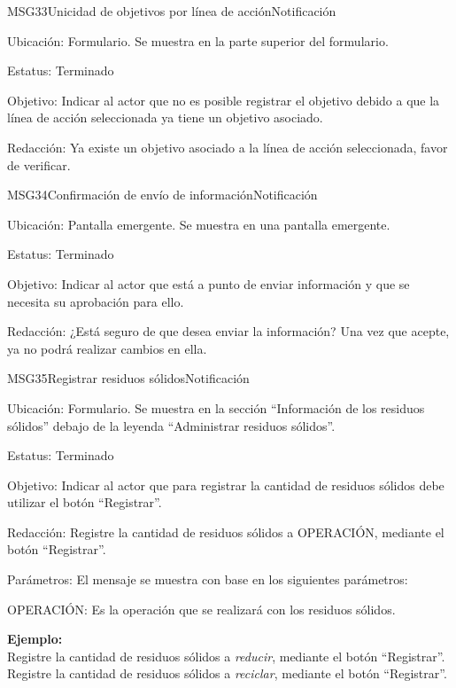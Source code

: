 \begin{mensaje}{MSG33}{Unicidad de objetivos por línea de acción}{Notificación}
\item[Ubicación:] Formulario. Se muestra en la parte superior del formulario.
\item[Estatus:] Terminado
\item[Objetivo:] Indicar al actor que no es posible registrar el objetivo debido a que la línea de acción seleccionada ya tiene un objetivo asociado.
\item[Redacción:] Ya existe un objetivo asociado a la línea de acción seleccionada, favor de verificar.
\end{mensaje}
\begin{mensaje}{MSG34}{Confirmación de envío de información}{Notificación}
\item[Ubicación:] Pantalla emergente. Se muestra en una pantalla emergente.
\item[Estatus:] Terminado
\item[Objetivo:] Indicar al actor que está a punto de enviar información y que se necesita su aprobación para ello.
\item[Redacción:] ¿Está seguro de que desea enviar la información? Una vez que acepte, ya no podrá realizar cambios en ella.
\end{mensaje}
\begin{mensaje}{MSG35}{Registrar residuos sólidos}{Notificación}
\item[Ubicación:] Formulario. Se muestra en la sección ``Información de los residuos sólidos'' debajo de la leyenda ``Administrar residuos sólidos''.
\item[Estatus:] Terminado
\item[Objetivo:] Indicar al actor que para registrar la cantidad de residuos sólidos debe utilizar el botón ``Registrar''.
\item[Redacción:] Registre la cantidad de residuos sólidos a OPERACIÓN, mediante el botón ``Registrar''.
\item[Parámetros:] El mensaje se muestra con base en los siguientes parámetros:
\begin{Citemize}
	\item OPERACIÓN: Es la operación que se realizará con los residuos sólidos.
\end{Citemize}
\item[]{\bf Ejemplo:}\\ 
		Registre la cantidad de residuos sólidos a {\em reducir}, mediante el botón ``Registrar''.\\
		Registre la cantidad de residuos sólidos a {\em reciclar}, mediante el botón ``Registrar''.
\end{mensaje}
